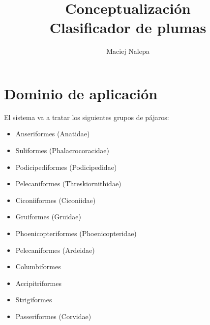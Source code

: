 \documentclass[a4paper,12pt]{article}
\title{Conceptualización\\ \normalsize{Clasificador de plumas}}
\author{Maciej Nalepa}
\begin{document}
\maketitle

\section{Dominio de aplicación}
El sistema va a tratar los siguientes grupos de pájaros:
\begin{itemize}
	\item Anseriformes (Anatidae)
	\item Suliformes (Phalacrocoracidae)
	\item Podicipediformes (Podicipedidae)
	\item Pelecaniformes (Threskiornithidae)
	\item Ciconiiformes (Ciconiidae)
	\item Gruiformes (Gruidae)
	\item Phoenicopteriformes (Phoenicopteridae)
	\item Pelecaniformes (Ardeidae)
	\item Columbiformes
	\item Accipitriformes
	\item Strigiformes
	\item Passeriformes (Corvidae)
\end{itemize}
\end{document}

